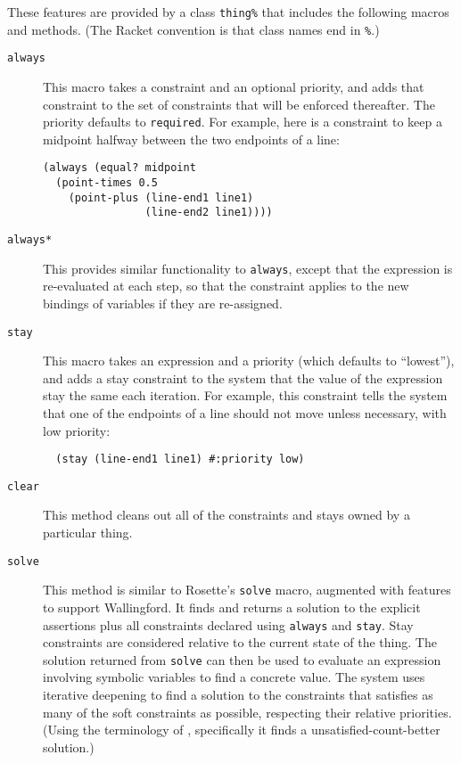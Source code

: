 \documentclass{sigplanconf}
\begin{document}
These features are provided by a class \verb|thing%| that includes the
following macros and methods.  (The Racket convention is that class
names end in {\tt \%}.)

\begin{description}

\item[{\tt always}] This macro takes a constraint and an optional
  priority, and adds that constraint to the set of constraints that will be
  enforced thereafter.  The priority defaults to {\tt required}.  For
  example, here is a constraint to keep a midpoint halfway between the two
  endpoints of a line:

\begin{verbatim}
(always (equal? midpoint 
  (point-times 0.5
    (point-plus (line-end1 line1)
                (line-end2 line1))))
\end{verbatim}

\item[{\tt always*}] This provides similar functionality to
  \verb|always|, except that the expression is re-evaluated at each
  step, so that the constraint applies to the new bindings of
  variables if they are re-assigned.

\item[{\tt stay}] This macro takes an expression and a priority (which
  defaults to ``lowest''), and adds a stay constraint to the system that
  the value of the expression stay the same each iteration.  For example,
  this constraint tells the system that one of the endpoints of a line
  should not move unless necessary, with low priority:

  \begin{verbatim}
  (stay (line-end1 line1) #:priority low)
  \end{verbatim}

\item[{\tt clear}]  This method cleans out all of the constraints
  and stays owned by a particular thing.

\item[{\tt solve}] This method is similar to Rosette's {\tt solve}
  macro, augmented with features to support Wallingford.  It finds and
  returns a solution to the explicit assertions plus all constraints
  declared using \verb|always| and \verb|stay|.  Stay constraints are
  considered relative to the current state of the thing.  The solution
  returned from {\tt solve} can then be used to evaluate an
  expression involving symbolic variables to find a concrete value.  The
  system uses iterative deepening to find a solution to the constraints
  that satisfies as many of the soft constraints as possible, respecting
  their relative priorities.  (Using the terminology of
  \cite{borning-lisp-symbolic-computation-1992}, specifically it finds a
  unsatisfied-count-better solution.)

\end{description}
\end{document}
